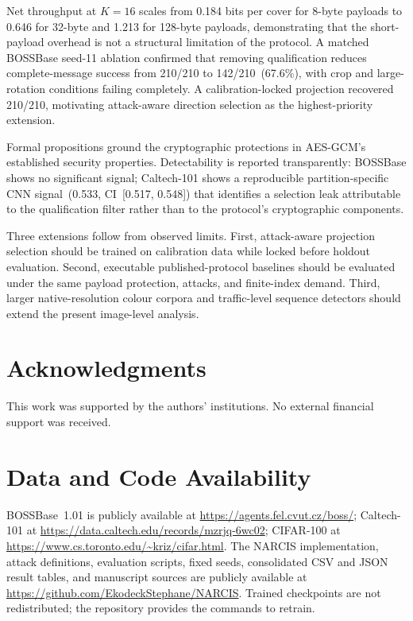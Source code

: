 ﻿\documentclass[10pt,journal]{IEEEtran}
\newcommand{\method}{NARCIS\xspace}
\begin{document}
Net throughput at $K{=}16$ scales from 0.184 bits per cover for
8-byte payloads to 0.646 for 32-byte and 1.213 for 128-byte payloads,
demonstrating that the short-payload overhead is not a structural
limitation of the protocol. A matched BOSSBase seed-11 ablation
confirmed that removing qualification reduces complete-message success
from 210/210 to 142/210~(67.6\%), with crop and large-rotation
conditions failing completely. A calibration-locked projection recovered
210/210, motivating attack-aware direction selection as the
highest-priority extension.

Formal propositions ground the cryptographic protections in AES-GCM's
established security properties. Detectability is reported
transparently: BOSSBase shows no significant signal; Caltech-101 shows
a reproducible partition-specific CNN signal~(0.533, CI~[0.517,
0.548]) that identifies a selection leak attributable to the
qualification filter rather than to the protocol's cryptographic
components.

Three extensions follow from observed limits. First, attack-aware
projection selection should be trained on calibration data while locked
before holdout evaluation. Second, executable published-protocol
baselines should be evaluated under the same payload protection,
attacks, and finite-index demand. Third, larger native-resolution
colour corpora and traffic-level sequence detectors should extend the
present image-level analysis.

\section*{Acknowledgments}

This work was supported by the authors' institutions. No external
financial support was received.

\appendix

\section*{Data and Code Availability}

BOSSBase~1.01 is publicly available at \url{https://agents.fel.cvut.cz/boss/};
Caltech-101 at \url{https://data.caltech.edu/records/mzrjq-6wc02};
CIFAR-100 at \url{https://www.cs.toronto.edu/~kriz/cifar.html}.
The \method implementation, attack definitions, evaluation scripts,
fixed seeds, consolidated CSV and JSON result tables, and manuscript
sources are publicly available at
\url{https://github.com/EkodeckStephane/NARCIS}. Trained checkpoints
are not redistributed; the repository provides the commands to retrain.



\end{document}
